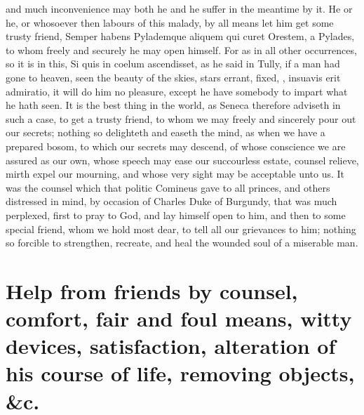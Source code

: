 {and much inconvenience may both he and he suffer in the meantime by it.
He or he, or whosoever then labours of this malady, by all means let
him get some trusty friend, Semper habens Pylademque aliquem qui
curet Orestem, a Pylades, to whom freely and securely he may open
himself. For as in all other occurrences, so it is in this, Si quis in
coelum ascendisset, \etc{} as he said in Tully, if a man had gone to
heaven, seen the beauty of the skies, stars errant, fixed, \etc{},
insuavis erit admiratio, it will do him no pleasure, except he have
somebody to impart what he hath seen. It is the best thing in the
world, as Seneca therefore adviseth in such a case, to get a
trusty friend, to whom we may freely and sincerely pour out our
secrets; nothing so delighteth and easeth the mind, as when we have a
prepared bosom, to which our secrets may descend, of whose conscience
we are assured as our own, whose speech may ease our succourless
estate, counsel relieve, mirth expel our mourning, and whose very sight
may be acceptable unto us. It was the counsel which that politic
Comineus gave to all princes, and others distressed in mind, by
occasion of Charles Duke of Burgundy, that was much perplexed, first to
pray to God, and lay himself open to him, and then to some special
friend, whom we hold most dear, to tell all our grievances to him;
nothing so forcible to strengthen, recreate, and heal the wounded soul
of a miserable man.

\section[Help from friends by counsel]{Help from friends by counsel, comfort, fair and foul means, witty devices, satisfaction, alteration of his course of life, removing objects, \&c.}

}
